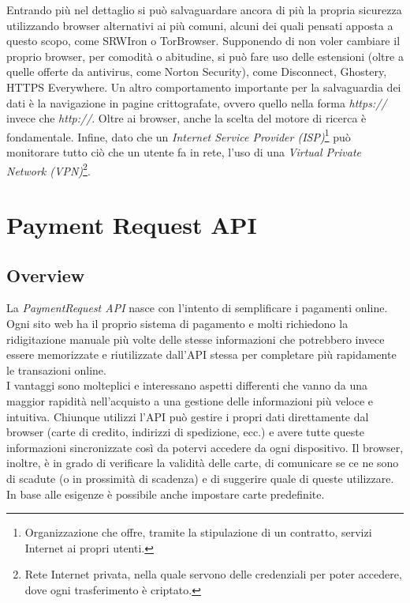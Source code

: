 \documentclass[12pt ,a4paper , twoside , openright ]{book}
\begin{document}
	Entrando più nel dettaglio si può salvaguardare ancora di più la propria sicurezza utilizzando browser alternativi ai più comuni, alcuni dei quali pensati apposta a questo scopo, come SRWIron o TorBrowser. Supponendo di non voler cambiare il proprio browser, per comodità o abitudine, si può fare uso delle estensioni (oltre a quelle offerte da antivirus, come Norton Security), come Disconnect, Ghostery, HTTPS Everywhere. Un altro comportamento importante per la salvaguardia dei dati è la navigazione in pagine crittografate, ovvero quello nella forma \textit{https://} invece che \textit{http://}. Oltre ai browser, anche la scelta del motore di ricerca è fondamentale. Infine, dato che un \textit{Internet Service Provider (ISP)}\footnote{Organizzazione che offre, tramite la stipulazione di un contratto, servizi Internet ai propri utenti.} può monitorare tutto ciò che un utente fa in rete, l'uso di una \textit{Virtual Private Network (VPN)}\footnote{Rete Internet privata, nella quale servono delle credenziali per poter accedere, dove ogni trasferimento è criptato.}.
	\cleardoublepage
	\chapter{Payment Request API}
	\section{Overview}
	La \textit{PaymentRequest API}\cite{rif9} nasce con l'intento di semplificare i pagamenti online. Ogni sito web ha il proprio sistema di pagamento e molti richiedono la ridigitazione manuale più volte delle stesse informazioni che potrebbero invece essere memorizzate e riutilizzate dall'API stessa per completare più rapidamente le transazioni online. \\
	I vantaggi sono molteplici\cite{rif13} e interessano aspetti differenti che vanno da una maggior rapidità nell'acquisto a una gestione delle informazioni più veloce e intuitiva. Chiunque utilizzi l'API può gestire i propri dati direttamente dal browser (carte di credito, indirizzi di spedizione, ecc.) e avere tutte queste informazioni sincronizzate così da potervi accedere da ogni dispositivo. Il browser, inoltre, è in grado di verificare la validità delle carte, di comunicare se ce ne sono di scadute (o in prossimità di scadenza) e di suggerire quale di queste utilizzare. In base alle esigenze è possibile anche impostare carte predefinite.
\end{document}
